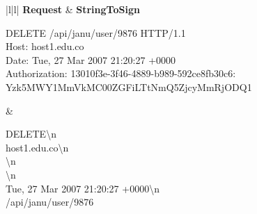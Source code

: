 \begin{tabular}{|l|l|} \hline
\textbf{Request} & \textbf{StringToSign} \\ \hline
{}%
{\raggedright DELETE /api/janu/user/9876 HTTP/1.1 \\
 Host: host1.edu.co \\
 Date: Tue, 27 Mar 2007 21:20:27 +0000 \\
 Authorization: 13010f3e-3f46-4889-b989-592ce8fb30c6: Yzk5MWY1MmVkMC00ZGFiLTtNmQ5ZjcyMmRjODQ1 } & %
{\raggedright DELETE\textbackslash{}n \\
 host1.edu.co\textbackslash{}n \\
 \textbackslash{}n \\
 \textbackslash{}n \\
 Tue, 27 Mar 2007 21:20:27 +0000\textbackslash{}n \\ /api/janu/user/9876} \tabularnewline \hline
\end{tabular}






